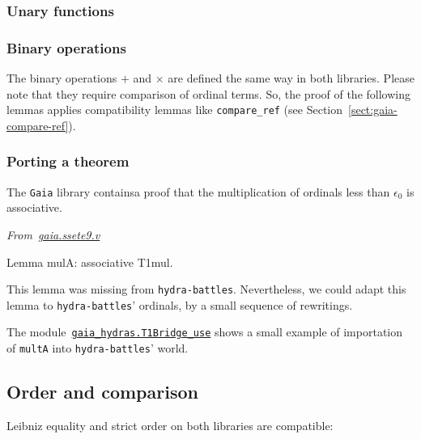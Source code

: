 \subsubsection{Unary functions}


\subsubsection{Binary operations}
The binary operations $+$ and $\times$ are defined the same way in both libraries. Please note that they require comparison of ordinal terms. So, the proof of the following lemmas applies
compatibility lemmas like \texttt{compare\_ref} (see Section~\vref{sect:gaia-compare-ref}).


\subsubsection{Porting a theorem}
The \texttt{Gaia} library containsa proof that the multiplication of ordinals less than $\epsilon_0$ is associative.

\emph{From~\href{https://github.com/coq-community/gaia/blob/master/theories/ssete9.v}{gaia.ssete9.v}}

\begin{Coqsrc}
Lemma mulA: associative T1mul.
\end{Coqsrc}

This lemma was missing from \texttt{hydra-battles}. Nevertheless, we could adapt this lemma to \texttt{hydra-battles}' ordinals, by a small sequence of rewritings.


The module~\href{../theories/html/gaia_hydras.T1Bridge_use.html}%
{\texttt{gaia\_hydras.T1Bridge\_use}} shows a small
example of importation of \texttt{multA} into \texttt{hydra-battles}' world.


\subsection{Order and comparison}
Leibniz equality and strict order on both libraries are
compatible:

\label{sect:gaia-compare-ref}

